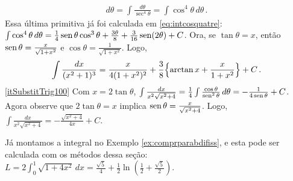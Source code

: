 \begin{Solution}{9.31}
\begin{align*}
d\theta=\int\frac{d\theta}{\sec^4\theta}=\int\cos^4\theta\,d\theta\,.
\end{align*}
Essa última primitiva já foi calculada em \eqref{eq:intcosquatre}:
$\int \cos^4\theta\,d \theta=\tfrac14\operatorname{sen}
\theta\cos^3\theta+\tfrac{3\theta}{8}+\tfrac{3}{16}
\operatorname{sen}(2\theta)+C$. Ora, se $\tan\theta=x$, então
$\operatorname{sen}\theta=\frac{x}{\sqrt{1+x^2}}$ e $\cos\theta=\frac{1}{\sqrt{1+x^2}}$.
Logo,
$$
\int\frac{dx}{(x^2+1)^3}=\frac{x}{4(1+x^2)^2}+\frac38\Bigl\{\arctan
x+\frac{x}{1+x^2}\Bigr\}+C\,.
$$
\eqref{itSubstitTrig100} Com $x=2\tan \theta$,
$\int\frac{dx}{x^2\sqrt{x^2+4}}=\tfrac14\int
\frac{\cos\theta}{\operatorname{sen}^2\theta}\,d\theta=-\frac{1}{4\operatorname{sen}\theta}+C$.
Agora observe que $2\tan \theta=x$ implica $\operatorname{sen}\theta=\frac{x}{\sqrt{x^2+4}}$.
Logo,
$\int\frac{dx}{x^2\sqrt{x^2+4}}=-\frac{\sqrt{x^2+4}}{4x}+C$.
\end{Solution}
\begin{Solution}{9.32}
Já montamos a integral no Exemplo \ref{ex:comprparabdifiss}, e esta pode ser
calculada com os métodos dessa seção:
$L=2\int_0^1\sqrt{1+4x^2}\,dx=\frac{\sqrt{5}}{4}+\frac12\ln(\frac12+\frac{\sqrt{5}}{2})$.
\end{Solution}
